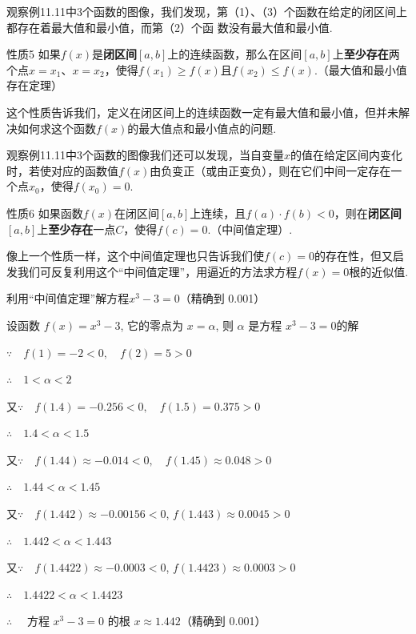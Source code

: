观察例11.11中3个函数的图像，我们发现，第（1）、（3）个函数在给定的闭区间上都存在着最大值和最小值，而第（2）个函
数没有最大值和最小值.

\begin{thm}{性质5}
    如果$f(x)$是\textbf{闭区间}$[a,b]$上的连续函数，那么在区间$[a,b]$上\textbf{至少存在}两个点$x=x_1$、$x=x_2$，使得$f(x_1)\ge f(x)$且$f(x_2)\le f(x)$.（最大值和最小值存在定理）
\end{thm}

这个性质告诉我们，定义在闭区间上的连续函数一定有最大值和最小值，但并未解决如何求这个函数$f(x)$的最大值点和最小值点的问题.

观察例11.11中3个函数的图像我们还可以发现，当自变量$x$的值在给定区间内变化时，若使对应的函数值$f(x)$由负变正（或由正变负），则在它们中间一定存在一个点$x_0$，使得$f(x_0)=0$.

\begin{thm}{性质6}
    如果函数$f(x)$在闭区间$[a,b]$上连续，且$f(a)\cdot f(b)<0$，则在\textbf{闭区间}$[a,b]$上\textbf{至少存在}一点$C$，使得$f(c)=0$.（中间值定理）.
\end{thm}

像上一个性质一样，这个中间值定理也只告诉我们使$f(c)=0$的存在性，但又启发我们可反复利用这个“中间值定理”，用逼近的方法求方程$f(x)=0$根的近似值.







\begin{example}
    利用“中间值定理”解方程$x^3-3=0$（精确到
0.001）
\end{example}

\begin{solution}
设函数 $f(x)=x^3-3$, 它的零点为 $x=\alpha$, 则 $\alpha$ 是方程
$x^3-3=0$的解

$\because\quad f( 1) = - 2< 0,\quad  f( 2) = 5> 0$

$\therefore\quad 1< \alpha < 2$ 

又$\because\quad f( 1. 4) = - 0.256< 0,\quad  f(1.5) = 0.375> 0$ 

$\therefore\quad 1.4< \alpha < 1.5$ 

又$\because\quad f( 1. 44) \approx - 0. 014< 0,\quad  f( 1. 45) \approx 0. 048> 0$

$\therefore\quad 1.44<\alpha<1.45$

又$\because\quad f( 1. 442) \approx - 0. 00156< 0$, 
$f(1.443)\approx0.0045>0$

$\therefore\quad 1. 442< \alpha < 1. 443$

又$\because\quad f( 1. 4422) \approx - 0. 0003< 0$, 
$f(1.4423)\approx0.0003>0$

$\therefore\quad 1. 4422< \alpha < 1. 4423$

$\therefore\quad $ 方程 $x^3-3=0$ 的根 $x\approx1.442$（精确到 0.001）
\end{solution}


